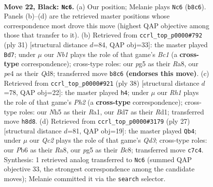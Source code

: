 \documentclass[11pt]{article}
\begin{document}
\clearpage

\begin{figure}[p]\centering
\begin{subfigure}{0.46\textwidth}\centering
\resizebox{\linewidth}{!}{%
\newchessgame
\chessboard[
  setfen={rn5r/2qb1kbp/pp1pp1p1/4p1Pn/4P3/2N2P2/PPPK1BQP/R3RB2 b - - 1 22},
  showmover=false,
  pgfstyle=straightmove, color=movearrow, markmove={b8-c6}
]}
\caption{}
\end{subfigure}\hfill
\begin{subfigure}{0.46\textwidth}\centering
\resizebox{\linewidth}{!}{%
\newchessgame
\chessboard[
  setfen={r1bqnrk1/p5bp/1p1p2p1/2pP1p2/2P2B2/2NB3P/PP3PP1/1RQ1R1K1 b - - 1 16},
  showmover=false,
  pgfstyle=straightmove, color=movearrow, markmove={c8-d7}
]}
\caption{}
\end{subfigure}
\\[4pt]
\begin{subfigure}{0.46\textwidth}\centering
\resizebox{\linewidth}{!}{%
\newchessgame
\chessboard[
  setfen={q2rr1k1/p2nbpp1/b1p1p2p/Pp2P3/1n1P4/1P3NP1/1Q3PBP/RN1RB1K1 w - - 1 20},
  showmover=false,
  pgfstyle=straightmove, color=movearrow, markmove={h2-h4}
]}
\caption{}
\end{subfigure}\hfill
\begin{subfigure}{0.46\textwidth}\centering
\resizebox{\linewidth}{!}{%
\newchessgame
\chessboard[
  setfen={r1b2rk1/1p2p1bp/2pq1np1/p2p4/P2P1P2/R5P1/1PP2NBP/2BQ1RK1 b - - 2 14},
  showmover=false,
  pgfstyle=straightmove, color=movearrow, markmove={d6-b4}
]}
\caption{}
\end{subfigure}
\caption{\textbf{Move 22, Black: \texttt{Nc6}.} (a) Our position; Melanie plays \texttt{Nc6} (\texttt{b8c6}). Panels (b)--(d) are the retrieved master positions whose correspondence most drove this move (highest QAP objective among those that transfer to it). (b) Retrieved from \texttt{ccrl\_top\_p0000\#792} (ply 31) [structural distance $d$=84, QAP obj=33]: the master played \texttt{Bd7}; under $\mu$ our \emph{Nb1} plays the role of that game's \emph{Bc1} (a \textbf{cross-type} correspondence); cross-type roles: our \emph{p}g5 as their \emph{R}a8, our \emph{p}e4 as their \emph{Q}d8; transferred move \texttt{b8c6} \textbf{(endorses this move)}. (c) Retrieved from \texttt{ccrl\_top\_p0000\#921} (ply 38) [structural distance $d$=78, QAP obj=22]: the master played \texttt{h4}; under $\mu$ our \emph{Rh1} plays the role of that game's \emph{Ph2} (a \textbf{cross-type} correspondence); cross-type roles: our \emph{N}h5 as their \emph{R}a1, our \emph{B}d7 as their \emph{R}d1; transferred move \texttt{h8d8}. (d) Retrieved from \texttt{ccrl\_top\_p0000\#3179} (ply 27) [structural distance $d$=81, QAP obj=19]: the master played \texttt{Qb4}; under $\mu$ our \emph{Qc2} plays the role of that game's \emph{Qd3}; cross-type roles: our \emph{P}b6 as their \emph{R}a8, our \emph{p}g5 as their \emph{B}c8; transferred move \texttt{c7c4}. Synthesis: 1 retrieved analog transferred to \texttt{Nc6} (summed QAP objective 33, the strongest correspondence among the candidate moves); Melanie committed it via the \texttt{search} selector.}
\label{fig:thought-m43}
\end{figure}
\end{document}
